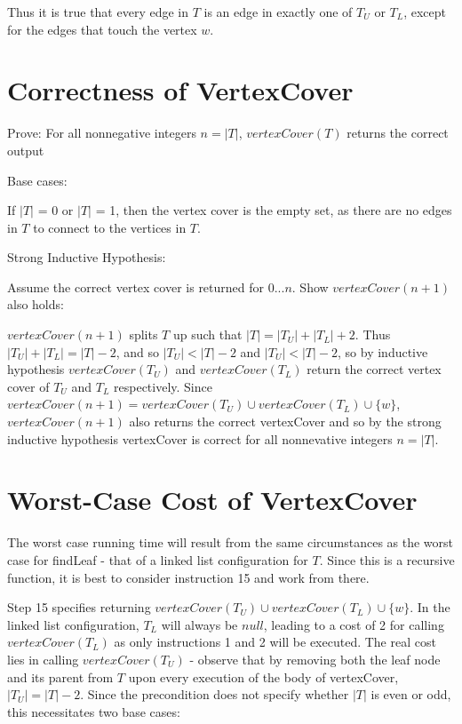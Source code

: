 \documentclass{article}
\begin{document}
Thus it is true that every edge in $T$ is an edge in exactly one of $T_U$ or
$T_L$, except for the edges that touch the vertex $w$.

\section{Correctness of VertexCover}

Prove: For all nonnegative integers $n = |T|$, $vertexCover(T)$ returns the
correct output

Base cases:

If $|T|$ = 0 or $|T|$ = 1, then the vertex cover is the empty set, as
there are no edges in $T$ to connect to the vertices in $T$.

Strong Inductive Hypothesis:

Assume the correct vertex cover is returned for $0...n$.
Show $vertexCover(n+1)$ also holds:

$vertexCover(n+1)$ splits $T$ up such that $|T| = |T_U| + |T_L|
+ 2$. Thus $|T_U| + |T_L| = |T|-2$, and so $|T_U| < |T|-2$ and $|T_U| < |T|-2$,
so by inductive hypothesis $vertexCover(T_U)$ and $vertexCover(T_L)$ return the
correct vertex cover of $T_U$ and $T_L$ respectively. Since $vertexCover(n+1) =
vertexCover(T_U) \cup vertexCover(T_L) \cup \{w\}$, $vertexCover(n+1)$ also
returns the correct vertexCover and so by the strong inductive hypothesis
vertexCover is correct for all nonnevative integers $n = |T|$.

\section{Worst-Case Cost of VertexCover}

The worst case running time will result from the same circumstances as the
worst case for findLeaf - that of a linked list configuration for $T$. Since
this is a recursive function, it is best to consider instruction 15 and work
from there.

Step 15 specifies returning $vertexCover(T_U) \cup vertexCover(T_L) \cup
\{w\}$. In the linked list configuration, $T_L$ will always be $null$, leading
to a cost of 2 for calling $vertexCover(T_L)$ as only instructions 1 and 2 will
be executed. The real cost lies in calling $vertexCover(T_U)$ - observe that by
removing both the leaf node and its parent from $T$ upon every execution of the
body of vertexCover, $|T_U| = |T|-2$. Since the precondition does not specify
whether $|T|$ is even or odd, this necessitates two base cases:
\end{document}
